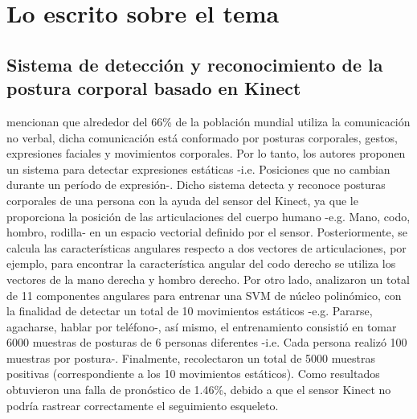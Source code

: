 \newpage 
\section{Lo escrito sobre el tema} \label{tr}
\subsection{Sistema de detecci\'on y reconocimiento de la postura corporal basado en Kinect} \label{tr:1}
 mencionan que alrededor del 66\% de la poblaci\'on mundial utiliza la comunicaci\'on no verbal, dicha comunicaci\'on est\'a conformado por posturas corporales, gestos, expresiones faciales y movimientos corporales. Por lo tanto, los autores proponen un sistema para detectar expresiones est\'aticas -i.e. Posiciones que no cambian durante un per\'iodo de expresi\'on-.
\medbreak
Dicho sistema detecta y reconoce posturas corporales de una persona con la ayuda del sensor del Kinect, ya que le proporciona la posici\'on de las articulaciones del cuerpo humano -e.g. Mano, codo, hombro, rodilla- en un espacio vectorial definido por el sensor. Posteriormente, se calcula las caracter\'isticas angulares respecto a dos vectores de articulaciones, por ejemplo, para encontrar la caracter\'istica angular del codo derecho se utiliza los vectores de la mano derecha y hombro derecho.
\medbreak
Por otro lado,  analizaron un total de 11 componentes angulares para entrenar una \acrfull{SVM} de n\'ucleo polin\'omico, con la finalidad de detectar un total de 10 movimientos est\'aticos -e.g. Pararse, agacharse, hablar por tel\'efono-, as\'i mismo, el entrenamiento consisti\'o en tomar 6000 muestras de posturas de 6 personas diferentes -i.e. Cada persona realiz\'o 100 muestras por postura-.
\medbreak
Finalmente,  recolectaron un total de 5000 muestras positivas (correspondiente a los 10 movimientos est\'aticos).  Como resultados obtuvieron una falla de pron\'ostico de 1.46\%, debido a que el sensor Kinect no podr\'ia rastrear correctamente el seguimiento esqueleto.
